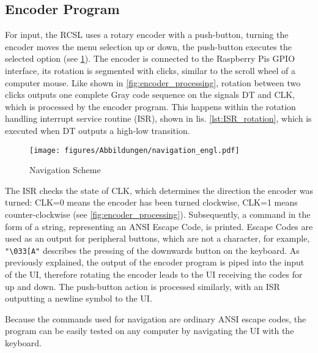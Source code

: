 

\subsection{Encoder Program}
For input, the RCSL uses a rotary encoder with a push-button, turning the encoder moves the menu selection up or down, the push-button executes the selected option (see \cref{fig:navigation}).
The encoder is connected to the Raspberry Pis GPIO interface, its rotation is segmented with clicks, similar to the scroll wheel of a computer mouse.
Like shown in \cref{fig:encoder_processing}, rotation between two clicks outputs one complete Gray code sequence on the signals DT and CLK, which is processed by the encoder program.
This happens within the rotation handling interrupt service routine (ISR), shown in lis. \ref{lst:ISR_rotation}, which is executed when DT outputs a high-low transition.

\begin{figure}[h]
    \centering
    \texttt{[image: figures/Abbildungen/navigation\_engl.pdf]}
    \caption{Navigation Scheme}
    \label{fig:navigation}
\end{figure}

The ISR checks the state of CLK, which determines the direction the encoder was turned: CLK=0 means the encoder has been turned clockwise, CLK=1 means counter-clockwise (see \cref{fig:encoder_processing}).
Subsequently, a command in the form of a string, representing an ANSI Escape Code, is printed.
Escape Codes are used as an output for peripheral buttons, which are not a character, for example, \lstinline[style=inline]|"\033[A"| describes the pressing of the downwards button on the keyboard.
As previously explained, the output of the encoder program is piped into the input of the UI, therefore rotating the encoder leads to the UI receiving the codes for up and down.
The push-button action is processed similarly, with an ISR outputting a newline symbol to the UI.

\newpage


Because the commands used for navigation are ordinary ANSI escape codes, the program can be easily tested on any computer by navigating the UI with the keyboard.

